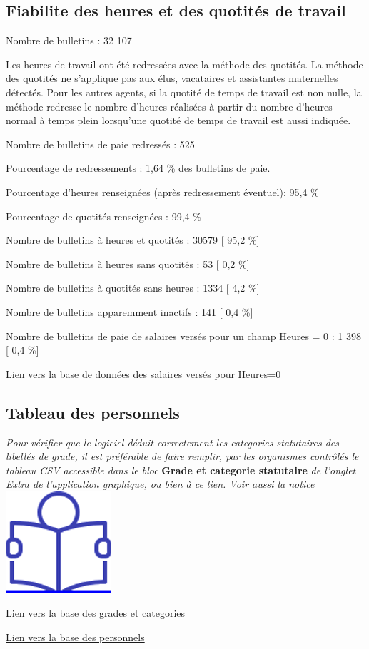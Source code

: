 \hypertarget{fiabilite-des-heures-et-des-quotites-de-travail}{%
\subsection{Fiabilite des heures et des quotités de
travail}\label{fiabilite-des-heures-et-des-quotites-de-travail}}

Nombre de bulletins : 32 107

Les heures de travail ont été redressées avec la méthode des quotités.
La méthode des quotités ne s'applique pas aux élus, vacataires et
assistantes maternelles détectés. Pour les autres agents, si la quotité
de temps de travail est non nulle, la méthode redresse le nombre
d'heures réalisées à partir du nombre d'heures normal à temps plein
lorsqu'une quotité de temps de travail est aussi indiquée.

Nombre de bulletins de paie redressés : 525

Pourcentage de redressements : 1,64 \% des bulletins de paie.

Pourcentage d'heures renseignées (après redressement éventuel): 95,4 \%

Pourcentage de quotités renseignées : 99,4 \%

Nombre de bulletins à heures et quotités : 30579 {[} 95,2 \%{]}

Nombre de bulletins à heures sans quotités : 53 {[} 0,2 \%{]}

Nombre de bulletins à quotités sans heures : 1334 {[} 4,2 \%{]}

Nombre de bulletins apparemment inactifs : 141 {[} 0,4 \%{]}

Nombre de bulletins de paie de salaires versés pour un champ Heures = 0
: 1 398 {[} 0,4 \%{]}

\href{../Bases/Fiabilite/base.heures.nulles.salaire.nonnull.csv}{Lien vers
la base de données des salaires versés pour Heures=0}

\hypertarget{tableau-des-personnels}{%
\subsection{Tableau des personnels}\label{tableau-des-personnels}}

\emph{Pour vérifier que le logiciel déduit correctement les categories
statutaires des libellés de grade, il est préférable de faire remplir,
par les organismes contrôlés le tableau CSV accessible dans le bloc}
\textbf{Grade et categorie statutaire} \emph{de l'onglet Extra de
l'application graphique, ou bien à ce lien. Voir aussi la notice} ~
\href{../Docs/Notices/fiche_tableau_categories.odt}{\includegraphics{icones/Notice.png}}

\href{../Bases/Effectifs/grades.categories.csv}{Lien vers la base des
grades et categories}

\href{../Bases/Effectifs/matricules.csv}{Lien vers la base des personnels}
